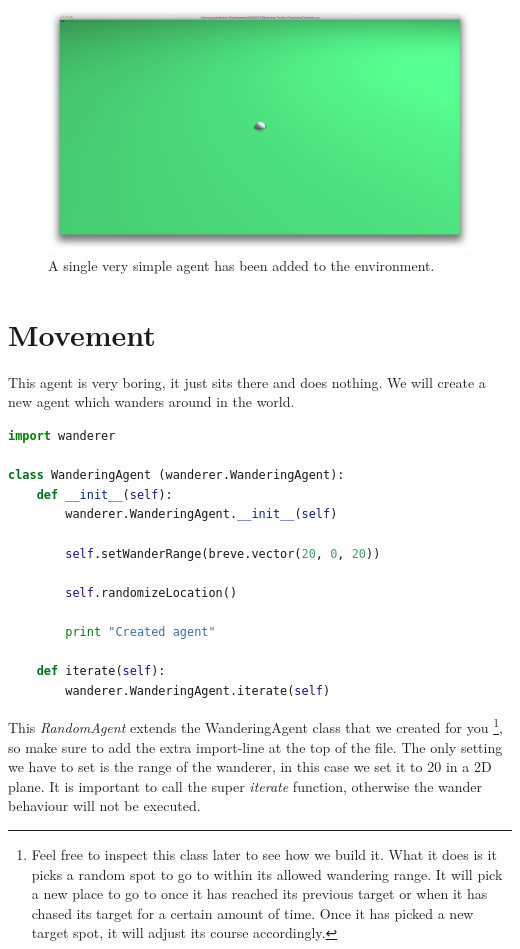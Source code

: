 \begin{figure}[htbp]
\begin{center}
\includegraphics{graphics/simpleagent}
\caption{A single very simple agent has been added to the environment.}
\end{center}
\end{figure}

\section{Movement}
This agent is very boring, it just sits there and does nothing. We will create a new agent which wanders around in the world.

\begin{fullwidth}
\begin{lstlisting}[language=Python]
import wanderer

class WanderingAgent (wanderer.WanderingAgent):
	def __init__(self):
		wanderer.WanderingAgent.__init__(self)

		self.setWanderRange(breve.vector(20, 0, 20))
		
		self.randomizeLocation()
		
		print "Created agent"

	def iterate(self):
		wanderer.WanderingAgent.iterate(self)
\end{lstlisting}
\end{fullwidth}


This \textit{RandomAgent} extends the WanderingAgent class that we created for you \footnote{Feel free to inspect this class later to see how we build it. What it does is it picks a random spot to go to within its allowed wandering range. It will pick a new place to go to once it has reached its previous target or when it has chased its target for a certain amount of time. Once it has picked a new target spot, it will adjust its course accordingly.}, so make sure to add the extra import-line at the top of the file. The only setting we have to set is the range of the wanderer, in this case we set it to 20 in a 2D plane. It is important to call the super \textit{iterate} function, otherwise the wander behaviour will not be executed.

